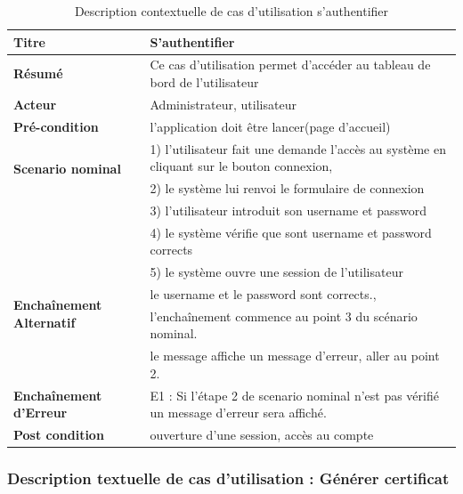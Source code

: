\documentclass[12pt,a4paper]{article}
\begin{document}
			\begin{table}[H]
			
				\centering
					\caption{Description contextuelle de cas d'utilisation s'authentifier}
				\begin{tabular}{|l|p{11cm}|}
					\hline 
						\textbf{Titre} & S'authentifier \\ 
					\hline 
						\textbf{Résumé} & Ce cas d'utilisation permet d'accéder au tableau de bord de l'utilisateur \\ 
					\hline 
						\textbf{Acteur} & Administrateur, utilisateur \\  
				
					\hline 
						\textbf{Pré-condition} & l'application doit être lancer(page d'accueil) \\ 
					\hline 
						\multirow{2}{*}{\textbf{Scenario nominal}} & 1) l'utilisateur fait une demande l'accès au système en cliquant sur le bouton connexion, \\
							 & 2) le système lui renvoi le formulaire de connexion \\
							 & 3) l'utilisateur introduit son username et password \\
							 & 4) le système vérifie que  sont username et password corrects \\
							 & 5) le système ouvre une session de l'utilisateur \\
					\hline 
					
						\multirow{2}{*}{\textbf{Enchaînement Alternatif}} & le username et le password sont corrects., \\
							  & l'enchaînement commence au point 3 du scénario nominal. \\
							 & le message affiche un message d'erreur, aller au point 2. \\
					\hline 
						\textbf{Enchaînement d'Erreur} & E1 : Si l'étape 2 de scenario nominal n'est pas vérifié un message d'erreur sera affiché. \\
					\hline
						\textbf{Post condition} & ouverture d'une session, accès au compte\\
					\hline
				
			\end{tabular} 
			
		\end{table}
		
		
		
		\subsubsection{Description textuelle de cas d'utilisation : Générer certificat}
		
\end{document}
